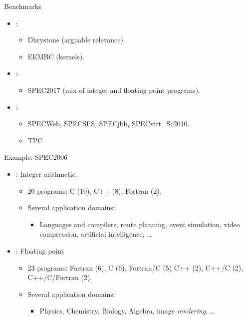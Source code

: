 \begin{frame}[t]{Benchmarks}
\begin{itemize}
  \item {}:
    \begin{itemize}
      \item Dhrystone (arguable relevance).
      \item EEMBC (kernels).
    \end{itemize}

  \item {}:
    \begin{itemize}
      \item SPEC2017 (mix of integer and floating point programs).
    \end{itemize}

  \item {}:
    \begin{itemize}
      \item SPECWeb, SPECSFS, SPECjbb, SPECvirt\_Sc2010.
      \item TPC
    \end{itemize}
\end{itemize}
\end{frame}

\begin{frame}[t]{Example: SPEC2006}
\begin{itemize}
  \item {}: Integer arithmetic.
    \begin{itemize}
      \item 20 programs: C (10), C++ (8), Fortran (2).
      \item Several application domains:
        \begin{itemize}
          \item Languages and compilers, 
                route planning,
                event simulation,
                video compression, 
                artificial intelligence, \ldots
        \end{itemize}
    \end{itemize}

  \item {}: Floating point
    \begin{itemize}
      \item 23 programs:
           Fortran (6),
           C (6),
           Fortran/C (5)
           C++ (2),
           C++/C (2),
           C++/C/Fortran (2).
      \item Several application domains:
        \begin{itemize}
          \item Physics, Chemistry, Biology, Algebra, image \emph{rendering},
                \ldots
        \end{itemize}
    \end{itemize}
\end{itemize}
\end{frame}
